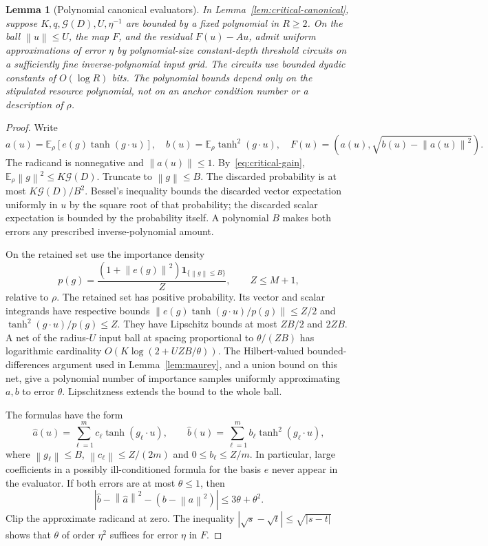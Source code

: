 \documentclass[11pt]{article}
\newtheorem{lemma}[theorem]{Lemma}
\theoremstyle{remark}
\newcommand{\E}{\mathbb E}
\newcommand{\Gain}{\mathcal G}
\newcommand{\norm}[1]{\left\lVert #1\right\rVert}
\begin{document}
\begin{lemma}[Polynomial canonical evaluators]
\label{lem:critical-evaluation}
In Lemma~\ref{lem:critical-canonical}, suppose
$K,q,\Gain(D),U,\eta^{-1}$ are bounded by a fixed polynomial in
$R\ge2$. On the ball $\norm u\le U$, the map $F$, and the residual
$F(u)-Au$, admit uniform approximations of error $\eta$ by
polynomial-size constant-depth threshold circuits on a sufficiently
fine inverse-polynomial input grid. The circuits use bounded dyadic
constants of $O(\log R)$ bits. The polynomial bounds depend only
on the stipulated resource polynomial, not on an anchor condition
number or a description of $\rho$.
\end{lemma}
\begin{proof}
Write
\[
 a(u)=\E_\rho[e(g)\tanh(g\cdot u)],\quad
 b(u)=\E_\rho\tanh^2(g\cdot u),\quad
 F(u)=(a(u),\sqrt{b(u)-\norm{a(u)}^2}).
\]
The radicand is nonnegative and $\norm{a(u)}\le1$.
By~\eqref{eq:critical-gain},
$\E_\rho\norm g^2\le K\Gain(D)$. Truncate to $\norm g\le B$.
The discarded probability is at most $K\Gain(D)/B^2$. Bessel's
inequality bounds the discarded vector expectation uniformly in $u$
by the square root of that probability; the discarded scalar
expectation is bounded by the probability itself. A polynomial $B$
makes both errors any prescribed inverse-polynomial amount.

On the retained set use the importance density
\[
 p(g)=\frac{(1+\norm{e(g)}^2)\boldsymbol1_{\{\norm g\le B\}}}{Z},
 \qquad Z\le M+1,
\]
relative to $\rho$. The retained set has positive probability.
Its vector and scalar integrands have respective bounds
$\norm{e(g)\tanh(g\cdot u)/p(g)}\le Z/2$ and
$\tanh^2(g\cdot u)/p(g)\le Z$.
They have Lipschitz bounds at most $ZB/2$ and $2ZB$.
A net of the radius-$U$ input ball at spacing proportional to
$\theta/(ZB)$ has logarithmic cardinality
$O(K\log(2+UZB/\theta))$. The Hilbert-valued bounded-differences
argument used in Lemma~\ref{lem:maurey}, and a union bound on this
net, give a polynomial number of importance samples uniformly
approximating $a,b$ to error $\theta$. Lipschitzness extends the
bound to the whole ball.

The formulas have the form
\[
 \widehat a(u)=\sum_{\ell=1}^m c_\ell\tanh(g_\ell\cdot u),
 \qquad
 \widehat b(u)=\sum_{\ell=1}^m b_\ell\tanh^2(g_\ell\cdot u),
\]
where $\norm{g_\ell}\le B$, $\norm{c_\ell}\le Z/(2m)$ and
$0\le b_\ell\le Z/m$. In particular, large coefficients in a
possibly ill-conditioned formula for the basis $e$ never appear in
the evaluator. If both errors are at most $\theta\le1$, then
\[
 \left|\widehat b-\norm{\widehat a}^2
                  -(b-\norm a^2)\right|\le3\theta+\theta^2.
\]
Clip the approximate radicand at zero. The inequality
$|\sqrt s-\sqrt t|\le\sqrt{|s-t|}$ shows that
$\theta$ of order $\eta^2$ suffices for error $\eta$ in $F$.


\end{proof}
\end{document}
